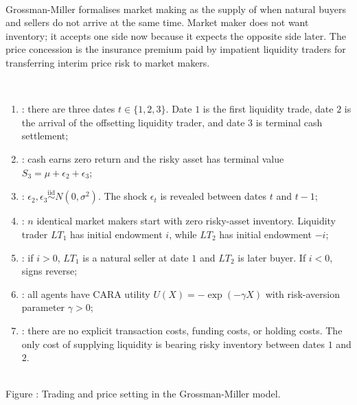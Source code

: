 \begin{model}  \citep{grossman-miller-1988}\\
Grossman-Miller formalises market making as the supply of  when natural buyers and sellers do not arrive at the same time. Market maker does not want inventory; it accepts one side now because it expects the opposite side later. The price concession is the insurance premium paid by impatient liquidity traders for transferring interim price risk to market makers.

\par\smallskip\noindent{}\\
\begin{enumerate}[label=\roman*.]
\setlength{\itemsep}{0pt}
\item {}: there are three dates $t\in\{1,2,3\}$. Date $1$ is the first liquidity trade, date $2$ is the arrival of the offsetting liquidity trader, and date $3$ is terminal cash settlement;
\item {}: cash earns zero return and the risky asset has terminal value $S_3=\mu+\epsilon_2+\epsilon_3$;
\item {}: $\epsilon_2,\epsilon_3\overset{\text{iid}}{\sim}N(0,\sigma^2)$. The shock $\epsilon_{t}$ is revealed between dates $t$ and $t-1$;
\item {}: $n$ identical market makers start with zero risky-asset inventory. Liquidity trader $LT_1$ has initial endowment $i$, while $LT_2$ has initial endowment $-i$;
\item {}: if $i>0$, $LT_1$ is a natural seller at date $1$ and $LT_2$ is later buyer. If $i<0$, signs reverse;
\item {}: all agents have CARA utility $U(X)=-\exp(-\gamma X)$ with risk-aversion parameter $\gamma>0$;
\item {}: there are no explicit transaction costs, funding costs, or holding costs. The only cost of supplying liquidity is bearing risky inventory between dates $1$ and $2$.
\end{enumerate}

\begin{center}
\label{fig:grossman_miller_trading}
\scalebox{0.82}{}\\
{\small Figure \thefigure: Trading and price setting in the Grossman-Miller model.}
\end{center}


\end{model}
